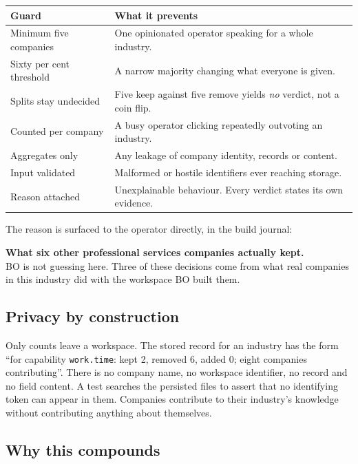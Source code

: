 \documentclass[11pt,a4paper]{article}
\newenvironment{callout}%
{\begin{center}\begin{lrbox}{\calloutbox}\begin{minipage}{\dimexpr0.94\textwidth-24pt\relax}\color{bodark}}%
{\end{minipage}\end{lrbox}\setlength{\fboxsep}{12pt}\colorbox{bosoft}{\usebox{\calloutbox}}\end{center}}
\begin{document}
\begin{center}
\begin{tabular}{@{}l p{9.0cm}@{}}
\toprule
\textbf{Guard} & \textbf{What it prevents} \\
\midrule
Minimum five companies    & One opinionated operator speaking for a whole industry. \\
Sixty per cent threshold  & A narrow majority changing what everyone is given. \\
Splits stay undecided     & Five keep against five remove yields \emph{no} verdict, not a coin flip. \\
Counted per company       & A busy operator clicking repeatedly outvoting an industry. \\
Aggregates only           & Any leakage of company identity, records or content. \\
Input validated           & Malformed or hostile identifiers ever reaching storage. \\
Reason attached           & Unexplainable behaviour. Every verdict states its own evidence. \\
\bottomrule
\end{tabular}
\end{center}

The reason is surfaced to the operator directly, in the build journal:

\begin{callout}
\textbf{What six other professional services companies actually kept.}\\
BO is not guessing here. Three of these decisions come from what real companies in this industry did
with the workspace BO built them.
\end{callout}

\subsection{Privacy by construction}

Only counts leave a workspace. The stored record for an industry has the form ``for capability
\texttt{work.time}: kept 2, removed 6, added 0; eight companies contributing''. There is no company
name, no workspace identifier, no record and no field content. A test searches the persisted files
to assert that no identifying token can appear in them. Companies contribute to their industry's
knowledge without contributing anything about themselves.

\subsection{Why this compounds}
\end{document}

